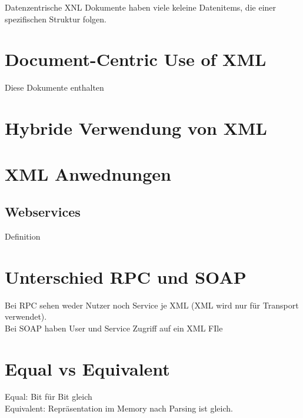 Datenzentrische XNL Dokumente haben viele keleine Datenitems, die einer spezifischen Struktur folgen.

\section{Document-Centric Use of XML}
Diese Dokumente enthalten 

\section{Hybride Verwendung von XML}

\section{XML Anwednungen}
\subsection{Webservices}
Definition

\section{Unterschied RPC und SOAP}
Bei RPC sehen weder Nutzer noch Service je XML (XML wird nur für Transport verwendet).\\
Bei SOAP haben User und Service Zugriff auf ein XML FIle


\section{Equal vs Equivalent}
Equal: Bit für Bit gleich\\
Equivalent: Repräsentation im Memory nach Parsing ist gleich.











